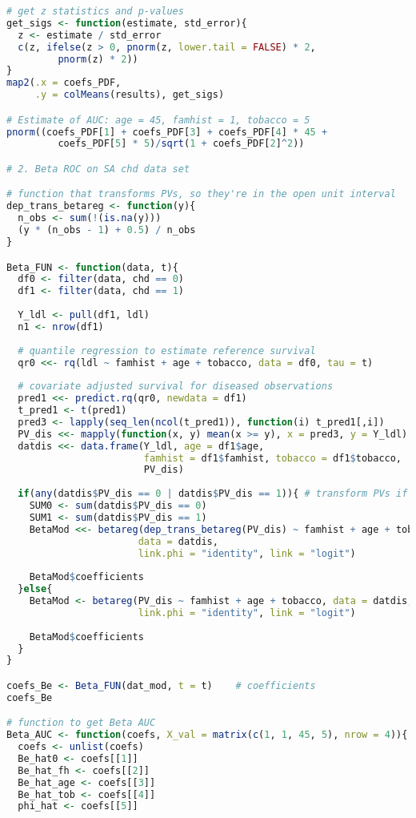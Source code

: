 \documentclass{article}
\begin{document}
\begin{lstlisting}[language=R]
# get z statistics and p-values
get_sigs <- function(estimate, std_error){
  z <- estimate / std_error
  c(z, ifelse(z > 0, pnorm(z, lower.tail = FALSE) * 2,
         pnorm(z) * 2))
}
map2(.x = coefs_PDF,
     .y = colMeans(results), get_sigs)

# Estimate of AUC: age = 45, famhist = 1, tobacco = 5
pnorm((coefs_PDF[1] + coefs_PDF[3] + coefs_PDF[4] * 45 +
         coefs_PDF[5] * 5)/sqrt(1 + coefs_PDF[2]^2))

# 2. Beta ROC on SA chd data set

# function that transforms PVs, so they're in the open unit interval
dep_trans_betareg <- function(y){
  n_obs <- sum(!(is.na(y)))
  (y * (n_obs - 1) + 0.5) / n_obs
}

Beta_FUN <- function(data, t){
  df0 <- filter(data, chd == 0)
  df1 <- filter(data, chd == 1)
  
  Y_ldl <- pull(df1, ldl)
  n1 <- nrow(df1)
  
  # quantile regression to estimate reference survival
  qr0 <<- rq(ldl ~ famhist + age + tobacco, data = df0, tau = t) 
  
  # covariate adjusted survival for diseased observations
  pred1 <<- predict.rq(qr0, newdata = df1)
  t_pred1 <- t(pred1)
  pred3 <- lapply(seq_len(ncol(t_pred1)), function(i) t_pred1[,i])
  PV_dis <<- mapply(function(x, y) mean(x >= y), x = pred3, y = Y_ldl) 
  datdis <<- data.frame(Y_ldl, age = df1$age, 
                        famhist = df1$famhist, tobacco = df1$tobacco,
                        PV_dis)
  
  if(any(datdis$PV_dis == 0 | datdis$PV_dis == 1)){ # transform PVs if any are 0 or 1
    SUM0 <- sum(datdis$PV_dis == 0)
    SUM1 <- sum(datdis$PV_dis == 1)
    BetaMod <<- betareg(dep_trans_betareg(PV_dis) ~ famhist + age + tobacco, 
                       data = datdis,
                       link.phi = "identity", link = "logit")
    
    BetaMod$coefficients
  }else{
    BetaMod <- betareg(PV_dis ~ famhist + age + tobacco, data = datdis,
                       link.phi = "identity", link = "logit")
    
    BetaMod$coefficients
  }
}

coefs_Be <- Beta_FUN(dat_mod, t = t)    # coefficients
coefs_Be

# function to get Beta AUC
Beta_AUC <- function(coefs, X_val = matrix(c(1, 1, 45, 5), nrow = 4)){
  coefs <- unlist(coefs)
  Be_hat0 <- coefs[[1]]
  Be_hat_fh <- coefs[[2]]
  Be_hat_age <- coefs[[3]]
  Be_hat_tob <- coefs[[4]]
  phi_hat <- coefs[[5]]
  

\end{lstlisting}
\end{document}
